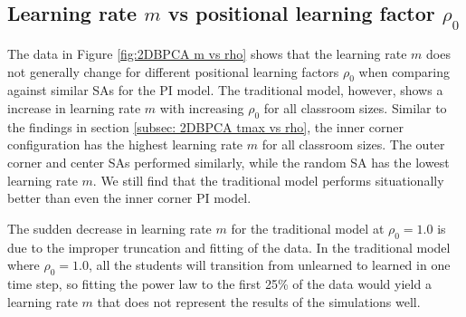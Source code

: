 \newpage

\subsection{Learning rate $m$ vs positional learning factor $\rho_0$}

The data in Figure \ref{fig:2DBPCA m vs rho} shows that the learning rate $m$ does not generally change for different positional learning factors $\rho_0$ when comparing against similar SAs for the PI model. The traditional model, however, shows a increase in learning rate $m$ with increasing $\rho_0$ for all classroom sizes. Similar to the findings in section \ref{subsec: 2DBPCA tmax vs rho}, the inner corner configuration has the highest learning rate $m$ for all classroom sizes. The outer corner and center SAs performed similarly, while the random SA has the lowest learning rate $m$. We still find that the traditional model performs situationally better than even the inner corner PI model. 

The sudden decrease in learning rate $m$ for the traditional model at $\rho_0 = 1.0$ is due to the improper truncation and fitting of the data. In the traditional model where $\rho_0 = 1.0$, all the students will transition from unlearned to learned in one time step, so fitting the power law to the first 25\% of the data would yield a learning rate $m$ that does not represent the results of the simulations well.

